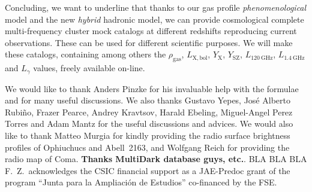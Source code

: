 \documentclass[traditabstract]{aa}
\newcommand{\rmn}{\mathrm}
\begin{document}
Concluding, we want to underline that thanks to our gas profile \emph{phenomenological} model and the new \emph{hybrid} hadronic model, we can provide cosmological complete multi-frequency cluster mock catalogs at different redshifts reproducing current observations. These can be used for different scientific purposes. We will make these catalogs, containing among others the $\rho_{\rmn{gas}}$, $L_{\rmn{X, bol}}$, $Y_{\rmn{X}}$, $Y_{\rmn{SZ}}$, $L_{120~\rmn{GHz}}$, $L_{1.4~\rmn{GHz}}$ and $L_{\gamma}$ values, freely available on-line.


\begin{acknowledgements}
We would like to thank Anders Pinzke for his invaluable help with the formulae and for many useful discussions. We also thanks Gustavo Yepes, Jos\'e Alberto Rubi\~no, Frazer Pearce, Andrey Kravtsov, Harald Ebeling, Miguel-Angel Perez Torres and Adam Mantz for the useful discussions and advices. We would also like to thank Matteo Murgia for kindly providing the radio surface brightness profiles of Ophiuchucs and Abell~2163, and Wolfgang Reich for providing the radio map of Coma. {\bf Thanks MultiDark database guys, etc.}.
BLA BLA BLA\\ 
F.~Z.~acknowledges the CSIC financial support as a JAE-Predoc grant of the program ``Junta para la Ampliaci\'on de Estudios'' co-financed by the FSE.
\end{acknowledgements}




\end{document}
